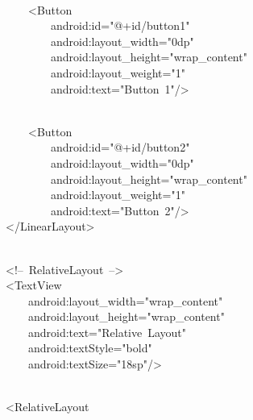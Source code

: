 \strut \\
{\ttfamily\small \ \ \ \ \ \ \ \ \ \ \ \ \textless{}Button} \\
{\ttfamily\small \ \ \ \ \ \ \ \ \ \ \ \ \ \ \ \ android:id="@+id/button1"} \\
{\ttfamily\small \ \ \ \ \ \ \ \ \ \ \ \ \ \ \ \ android:layout\_width="0dp"} \\
{\ttfamily\small \ \ \ \ \ \ \ \ \ \ \ \ \ \ \ \ android:layout\_height="wrap\_content"} \\
{\ttfamily\small \ \ \ \ \ \ \ \ \ \ \ \ \ \ \ \ android:layout\_weight="1"} \\
{\ttfamily\small \ \ \ \ \ \ \ \ \ \ \ \ \ \ \ \ android:text="Button\ 1"/\textgreater{}} \\
\strut \\
{\ttfamily\small \ \ \ \ \ \ \ \ \ \ \ \ \textless{}Button} \\
{\ttfamily\small \ \ \ \ \ \ \ \ \ \ \ \ \ \ \ \ android:id="@+id/button2"} \\
{\ttfamily\small \ \ \ \ \ \ \ \ \ \ \ \ \ \ \ \ android:layout\_width="0dp"} \\
{\ttfamily\small \ \ \ \ \ \ \ \ \ \ \ \ \ \ \ \ android:layout\_height="wrap\_content"} \\
{\ttfamily\small \ \ \ \ \ \ \ \ \ \ \ \ \ \ \ \ android:layout\_weight="1"} \\
{\ttfamily\small \ \ \ \ \ \ \ \ \ \ \ \ \ \ \ \ android:text="Button\ 2"/\textgreater{}} \\
{\ttfamily\small \ \ \ \ \ \ \ \ \textless{}/LinearLayout\textgreater{}} \\
\strut \\
{\ttfamily\small \ \ \ \ \ \ \ \ \textless{}!--\ RelativeLayout\ --\textgreater{}} \\
{\ttfamily\small \ \ \ \ \ \ \ \ \textless{}TextView} \\
{\ttfamily\small \ \ \ \ \ \ \ \ \ \ \ \ android:layout\_width="wrap\_content"} \\
{\ttfamily\small \ \ \ \ \ \ \ \ \ \ \ \ android:layout\_height="wrap\_content"} \\
{\ttfamily\small \ \ \ \ \ \ \ \ \ \ \ \ android:text="Relative\ Layout"} \\
{\ttfamily\small \ \ \ \ \ \ \ \ \ \ \ \ android:textStyle="bold"} \\
{\ttfamily\small \ \ \ \ \ \ \ \ \ \ \ \ android:textSize="18sp"/\textgreater{}} \\
\strut \\
{\ttfamily\small \ \ \ \ \ \ \ \ \textless{}RelativeLayout} \\
